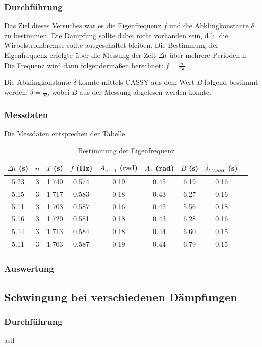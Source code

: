 \documentclass{article}
\begin{document}
\subsubsection{Durchführung}
Das Ziel dieses Versuches war es die Eigenfrequenz $f$ und die Abklingkonstante $\delta$ zu
bestimmen. Die Dämpfung sollte dabei nicht vorhanden sein, d.h. die Wirbelstrombremse
sollte ausgeschaltet bleiben. Die Bestimmung der Eigenfrequenz erfolgte über
die Messung der Zeit $\Delta t$ über mehrere Perioden n. Die Frequenz wird dann
folgendermaßen berechnet: $f = \frac{n}{\Delta t}$.

Die Abklingkonstante $\delta$ konnte mittels CASSY aus dem Wert $B$ folgend
bestimmt werden: $\delta = \frac{1}{B}$, wobei $B$ aus der Messung abgelesen werden konnte.
\subsubsection{Messdaten}
Die Messdaten entsprechen der Tabelle
\begin{table}[H]
    \centering
    \begin{tabular}{|c|c|c|c|c|c|c|c|c|}
    \hline
    $\Delta t$ (s) & $n$ & $T$ (s) & $f$ (Hz) & $A_{n+1}$ (rad) & $A_1$ (rad) & $B$ (s) & $\delta_{CASSY}$ (s) \\
    \hline
    5.23 & 3 & 1.740 & 0.574 & 0.19 & 0.45 & 6.19 & 0.16 \\
    5.15 & 3 & 1.717 & 0.583 & 0.18 & 0.43 & 6.27 & 0.16 \\
    5.11 & 3 & 1.703 & 0.587 & 0.16 & 0.42 & 5.56 & 0.18 \\
    5.16 & 3 & 1.720 & 0.581 & 0.18 & 0.43 & 6.28 & 0.16 \\
    5.14 & 3 & 1.713 & 0.584 & 0.18 & 0.44 & 6.60 & 0.15 \\
    5.11 & 3 & 1.703 & 0.587 & 0.19 & 0.44 & 6.79 & 0.15 \\
    \hline
    \end{tabular}
    \caption{Bestimmung der Eigenfrequenz}
    \label{tab:eigenfrequenz}
\end{table}
\subsubsection{Auswertung}

\subsection{Schwingung bei verschiedenen Dämpfungen}
\subsubsection{Durchführung}
asd
\end{document}
